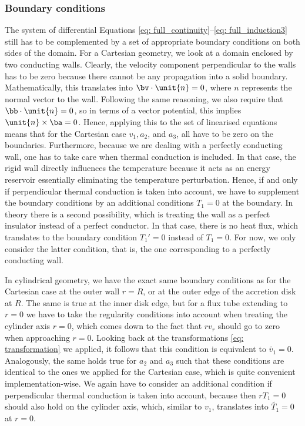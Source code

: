 \subsubsection{Boundary conditions}
The system of differential Equations \eqref{eq: full_continuity}--\eqref{eq: full_induction3} still has to be complemented by a set of appropriate boundary conditions on both sides of the domain. For a Cartesian geometry, we look at a domain enclosed by two conducting walls. Clearly, the velocity component perpendicular to the walls has to be zero because there cannot be any propagation into a solid boundary. Mathematically, this translates into $\bv \cdot \unit{n} = 0$, where $\unit{n}$ represents the normal vector to the wall. Following the same reasoning, we also require that $\bb \cdot \unit{n} = 0$, so in terms of a vector potential, this implies $\unit{n} \times \ba = 0$. Hence, applying this to the set of linearised equations means that for the Cartesian case $v_1, a_2$, and $a_3$, all have to be zero on the boundaries. Furthermore, because we are dealing with a perfectly conducting wall, one has to take care when thermal conduction is included. In that case, the rigid wall directly influences the temperature because it acts as an energy reservoir essentially eliminating the temperature perturbation. Hence, if and only if perpendicular thermal conduction is taken into account, we have to supplement the boundary conditions by an additional conditions $T_1 = 0$ at the boundary. In theory there is a second possibility, which is treating the wall as a perfect insulator instead of a perfect conductor. In that case, there is no heat flux, which translates to the boundary condition $T_1' = 0$ instead of $T_1 = 0$. For now, we only consider the latter condition, that is, the one corresponding to a perfectly conducting wall.

In cylindrical geometry, we have the exact same boundary conditions as for the Cartesian case at the outer wall $r = R$, or at the outer edge of the accretion disk at $R$. The same is true at the inner disk edge, but for a flux tube extending to $r = 0$ we have to take the regularity conditions into account when treating the cylinder axis $r = 0$, which comes down to the fact that $r v_r$ should go to zero when approaching $r = 0$. Looking back at the transformations \eqref{eq: transformation} we applied, it follows that this condition is equivalent to $\widetilde{v_1} = 0$. Analogously, the same holds true for $a_2$ and $a_3$ such that these conditions are identical to the ones we applied for the Cartesian case, which is quite convenient implementation-wise. We again have to consider an additional condition if perpendicular thermal conduction is taken into account, because then $r T_1 = 0$ should also hold on the cylinder axis, which, similar to $v_1$, translates into $\widetilde{T_1} = 0$ at $r = 0$.

